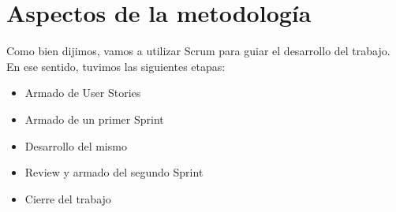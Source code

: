 \section{Aspectos de la metodología}

Como bien dijimos, vamos a utilizar Scrum para guiar el desarrollo del trabajo. En ese sentido, tuvimos las siguientes etapas:

\begin{itemize}

\item Armado de User Stories
\item Armado de un primer Sprint
\item Desarrollo del mismo
\item Review y armado del segundo Sprint
\item Cierre del trabajo

\end{itemize}
